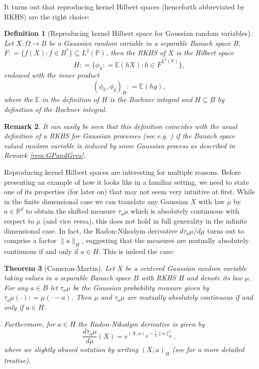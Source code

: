 \documentclass[11pt,reqno]{amsart}
\numberwithin{equation}{section}
\newtheorem{thm}{Theorem}[section]
\newtheorem{defi}[thm]{Definition}
\newtheorem{rem}[thm]{Remark}
\newcommand{\deq}{\mathrel{\mathop:}=}
\begin{document}
It turns out that reproducing kernel Hilbert spaces (henceforth abbreviated by RKHS) are the right choice:

\begin{defi}[Reproducing kernel Hilbert space for Gaussian random variables]
	Let $X:\Omega\rightarrow B$ be a Gaussian random variable in a separable Banach space $B$, $F\deq\{f(X):f\in B^*\}\subseteq L^2(\mathbb P)$, then the RKHS of $X$ is the Hilbert space $$H\deq\{\phi_h\deq\mathbb E(hX): h\in\overline F^{L^2(\mathbb P)}\},$$
	endowed with the inner product
	$$(\phi_h,\phi_g)_H\deq\mathbb E(hg),$$
	where the $\mathbb E$ in the definition of $H$ is the Bochner integral and $H\subseteq B$ by definition of the Bochner integral.
\end{defi}
\begin{rem}
	It can easily be seen that this definition coincides with the usual definition of a RKHS for Gaussian processes (see e.g. \cite{Nickl}) if the Banach space valued random variable is induced by some Gaussian process as described in Remark \ref{rem:GPandGrvs}.
\end{rem}

Reproducing kernel Hilbert spaces are interesting for multiple reasons. Before presenting an example of how it looks like in a familiar setting, we need to state one of its properties (for later on) that may not seem very intuitive at first. While in the finite dimensional case we can translate any Gaussian $X$ with law $\mu$ by $a\in\mathbb R^d$ to obtain the shifted measure $\tau_a\mu$ which is absolutely continuous with respect to $\mu$ (and vice versa), this does not hold in full generality in the infinite dimensional case. In fact, the Radon-Nikodym derivative $d\tau_a\mu/d\mu$ turns out to comprise a factor $\|a\|_H$, suggesting that the measures are mutually absolutely continuous if and only if $a\in H$. This is indeed the case:

\begin{thm}[Cameron-Martin]\label{thm:CameronMartin}
	Let $X$ be a centered Gaussian random variable taking values in a separable Banach space $B$ with RKHS $H$ and denote its law $\mu$. For any $a\in B$ let $\tau_a\mu$ be the Gaussian probability measure given by $\tau_a\mu(\cdot)\deq\mu(\cdot-a)$. Then $\mu$ and $\tau_a\mu$ are mutually absolutely continuous if and only if $a\in H$.
	
	Furthermore, for $a\in H$ the Radon-Nikodym derivative is given by $$\frac{d\tau_a\mu}{d\mu}(X)=e^{(X,a)_H-\frac{1}{2}\|a\|_H^2},$$
	where we slightly abused notation by writing $(X,a)_H$ (see \cite{Nickl} for a more detailed treatise).
\end{thm}
\end{document}
